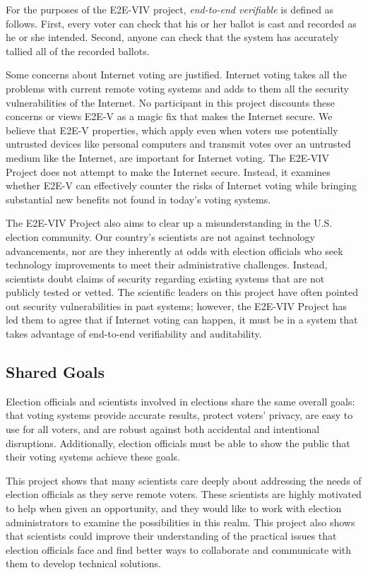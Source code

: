 For the purposes of the E2E-VIV project, \emph{end-to-end
  verifiable} is defined as follows. First, every voter can check
that his or her ballot is cast and recorded as he or she
intended. Second, anyone can check that the system has accurately
tallied all of the recorded ballots.

Some concerns about Internet voting are justified. Internet voting
takes all the problems with current remote voting systems and adds to
them all the security vulnerabilities of the Internet. No participant
in this project discounts these concerns or views E2E-V as a magic fix
that makes the Internet secure. We believe that E2E-V properties,
which apply even when voters use potentially untrusted devices like
personal computers and transmit votes over an untrusted medium like
the Internet, are important for Internet voting. The E2E-VIV Project
does not attempt to make the Internet secure. Instead, it examines
whether E2E-V can effectively counter the risks of Internet voting
while bringing substantial new benefits not found in today’s voting
systems.

The E2E-VIV Project also aims to clear up a misunderstanding in the
U.S. election community. Our country’s scientists are not against
technology advancements, nor are they inherently at odds with election
officials who seek technology improvements to meet their
administrative challenges. Instead, scientists doubt claims of
security regarding existing systems that are not publicly tested or
vetted. The scientific leaders on this project have often pointed out
security vulnerabilities in past systems; however, the E2E-VIV Project
has led them to agree that if Internet voting can happen, it must be
in a system that takes advantage of end-to-end verifiability and
auditability.

\subsection{Shared Goals}
\label{sec:shared-goals}

Election officials and scientists involved in elections share the same
overall goals: that voting systems provide accurate results, protect
voters’ privacy, are easy to use for all voters, and are robust
against both accidental and intentional disruptions. Additionally,
election officials must be able to show the public that their voting
systems achieve these goals.

This project shows that many scientists care deeply about addressing
the needs of election officials as they serve remote voters. These
scientists are highly motivated to help when given an opportunity, and
they would like to work with election administrators to examine the
possibilities in this realm. This project also shows that scientists
could improve their understanding of the practical issues that
election officials face and find better ways to collaborate and
communicate with them to develop technical solutions.

